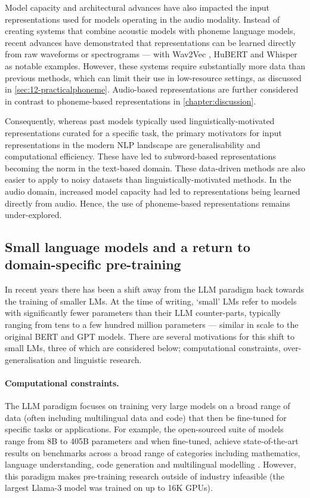 Model capacity and architectural advances have also impacted the input representations used for models operating in the audio modality. Instead of creating systems that combine acoustic models with phoneme language models, recent advances have demonstrated that representations can be learned directly from raw waveforms or spectrograms --- with Wav2Vec \citep{baevski2020wav2vec}, HuBERT \citep{hsu2021hubert} and Whisper \citep{radford2023robust} as notable examples. However, these systems require substantially more data than previous methods, which can limit their use in low-resource settings, as discussed in \cref{sec:12-practicalphoneme}. Audio-based representations are further considered in contrast to phoneme-based representations in \cref{chapter:discussion}.

Consequently, whereas past models typically used linguistically-motivated representations curated for a specific task, the primary motivators for input representations in the modern NLP landscape are generalisability and computational efficiency. These have led to subword-based representations becoming the norm in the text-based domain. These data-driven methods are also easier to apply to noisy datasets than linguistically-motivated methods. In the audio domain, increased model capacity had led to representations being learned directly from audio. Hence, the use of phoneme-based representations remains under-explored. 

\subsection{Small language models and a return to domain-specific pre-training}\label{sec:12-domainspecific}

In recent years there has been a shift away from the LLM paradigm back towards the training of smaller LMs. At the time of writing, `small' LMs  refer to models with significantly fewer parameters than their LLM counter-parts, typically ranging from tens to a few hundred million parameters --- similar in scale to the original BERT and GPT models. There are several motivations for this shift to small LMs, three of which are considered below; computational constraints, over-generalisation and linguistic research.

\paragraph{Computational constraints.} The LLM paradigm focuses on training very large models on a broad range of data (often including multilingual data and code) that then be fine-tuned for specific tasks or applications. For example, the open-sourced  suite of models range from 8B to 405B parameters and when fine-tuned, achieve state-of-the-art results on benchmarks across a broad range of categories including mathematics, language understanding, code generation and multilingual modelling \citep{grattafiori2024llama}. However, this paradigm makes pre-training research outside of industry infeasible (the largest Llama-3 model was trained on up to 16K GPUs).

